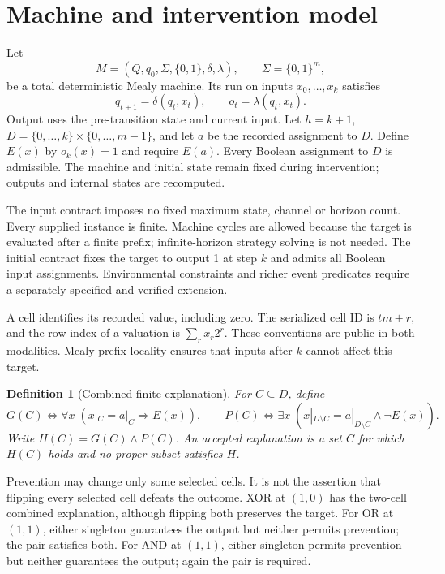 \documentclass[11pt]{article}
\newtheorem{definition}{Definition}
\begin{document}
\section{Machine and intervention model}
Let
\[
M=(Q,q_0,\Sigma,\{0,1\},\delta,\lambda),\qquad \Sigma=\{0,1\}^{m},
\]
be a total deterministic Mealy machine. Its run on inputs $x_0,\ldots,x_k$
satisfies
\[
q_{t+1}=\delta(q_t,x_t),\qquad o_t=\lambda(q_t,x_t).
\]
Output uses the pre-transition state and current input. Let $h=k+1$,
$D=\{0,\ldots,k\}\times\{0,\ldots,m-1\}$, and let $a$ be the recorded assignment
to $D$. Define $E(x)$ by $o_k(x)=1$ and require $E(a)$.
Every Boolean assignment to $D$ is admissible. The machine and initial state
remain fixed during intervention; outputs and internal states are recomputed.

The input contract imposes no fixed maximum state, channel or horizon count.
Every supplied instance is finite. Machine cycles are allowed because the target
is evaluated after a finite prefix; infinite-horizon strategy solving is not
needed. The initial contract fixes the target to output 1 at step $k$ and admits
all Boolean input assignments. Environmental constraints and richer event
predicates require a separately specified and verified extension.

A cell identifies its recorded value, including zero. The serialized cell ID is
$tm+r$, and the row index of a valuation is $\sum_r x_r2^r$.
These conventions are public in both modalities. Mealy prefix locality ensures
that inputs after $k$ cannot affect this target.

\begin{definition}[Combined finite explanation]
For $C\subseteq D$, define
\[
G(C)\iff \forall x\;(x|_C=a|_C\Rightarrow E(x)),
\qquad
P(C)\iff \exists x\;(x|_{D\setminus C}=a|_{D\setminus C}\land\neg E(x)).
\]
Write $H(C)=G(C)\land P(C)$. An accepted explanation is a set $C$ for which
$H(C)$ holds and no proper subset satisfies $H$.
\end{definition}

Prevention may change only some selected cells. It is not the assertion that
flipping every selected cell defeats the outcome. XOR at $(1,0)$ has the two-cell
combined explanation, although flipping both preserves the target.
For OR at $(1,1)$, either singleton guarantees the output but neither permits
prevention; the pair satisfies both. For AND at $(1,1)$, either singleton permits
prevention but neither guarantees the output; again the pair is required.
\end{document}
